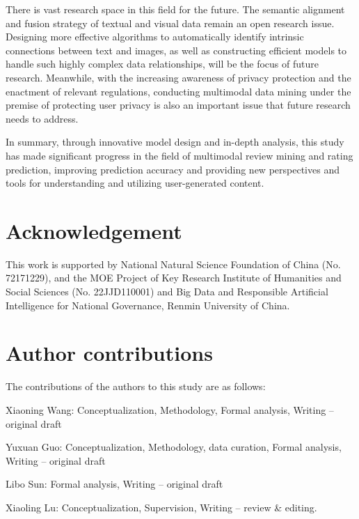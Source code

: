 \documentclass[preprint,12pt]{elsarticle}
\begin{document}
There is vast research space in this field for the future. The semantic alignment and fusion strategy of textual and visual data remain an open research issue. Designing more effective algorithms to automatically identify intrinsic connections between text and images, as well as constructing efficient models to handle such highly complex data relationships, will be the focus of future research. Meanwhile, with the increasing awareness of privacy protection and the enactment of relevant regulations, conducting multimodal data mining under the premise of protecting user privacy is also an important issue that future research needs to address.

In summary, through innovative model design and in-depth analysis, this study has made significant progress in the field of multimodal review mining and rating prediction, improving prediction accuracy and providing new perspectives and tools for understanding and utilizing user-generated content.

\section*{Acknowledgement}
This work is supported by National Natural Science Foundation of China (No. 72171229), and the MOE Project of Key Research Institute of Humanities and Social Sciences (No. 22JJD110001) and Big Data and Responsible Artificial Intelligence for National Governance, Renmin University of China. 


\section*{Author contributions}
The contributions of the authors to this study are as follows: 

Xiaoning Wang: Conceptualization, Methodology, Formal analysis, Writing – original draft 

Yuxuan Guo: Conceptualization, Methodology, data curation, Formal analysis, Writing – original draft

Libo Sun: Formal analysis, Writing – original draft

Xiaoling Lu: Conceptualization, Supervision, Writing – review & editing.



\section*{ }



%
%
%
\end{document}
